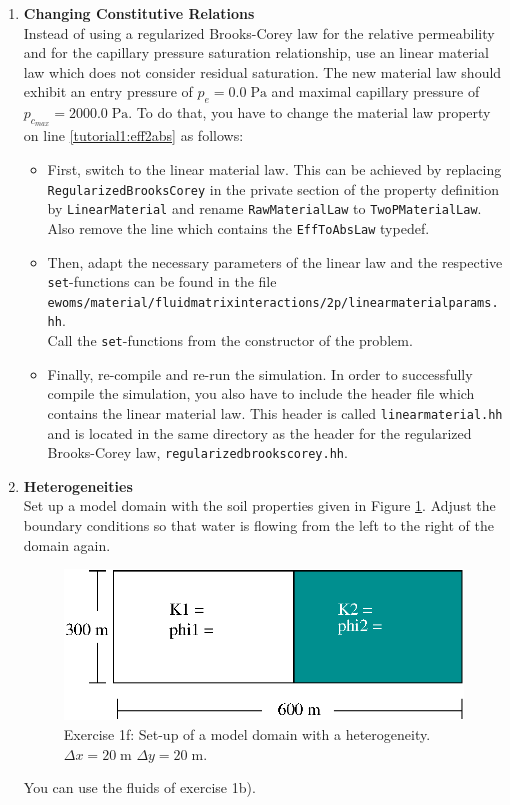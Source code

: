\begin{enumerate}
\item \textbf{Changing Constitutive Relations} \\
  Instead of using a regularized Brooks-Corey law for the relative
  permeability and for the capillary pressure saturation relationship,
  use an linear material law which does not consider residual
  saturation. The new material law should exhibit an entry pressure of
  $p_e = 0.0\;\text{Pa}$ and maximal capillary pressure of
  $p_{c_{max}} = 2000.0\;\text{Pa}$. To do that, you have to change
  the material law property on line
  \ref{tutorial1:eff2abs} as follows:
\begin{itemize}
\item First, switch to the linear material law. This can be achieved
  by replacing \texttt{RegularizedBrooksCorey} in the private section
  of the property definition by \texttt{LinearMaterial} and rename
  \texttt{RawMaterialLaw} to \texttt{TwoPMaterialLaw}. Also remove the
  line which contains the \texttt{EffToAbsLaw} typedef.
\item Then, adapt the necessary parameters of the linear law and the
  respective \texttt{set}-functions can be found in the file
  \texttt{ewoms/material/fluidmatrixinteractions/2p/linearmaterialparams.hh}.\\
  Call the \texttt{set}-functions from the constructor of the problem.
\item Finally, re-compile and re-run the simulation. In order to
  successfully compile the simulation, you also have to include the
  header file which contains the linear material law. This header is
  called \texttt{linearmaterial.hh} and is located in the same
  directory as the header for the regularized Brooks-Corey law,
  \texttt{regularizedbrookscorey.hh}.
\end{itemize}
 
\item \textbf{Heterogeneities}  \\
  Set up a model domain with the soil properties given in Figure
  \ref{tutorial1:exercise1_d}. Adjust the boundary conditions
  so that water is flowing from the left to the right of the domain again.
\begin{figure}[ht]
\centering
\includegraphics[width=0.5\linewidth,keepaspectratio]{EPS/exercise1_c.eps}
\caption{Exercise 1f: Set-up of a model domain with a heterogeneity. $\Delta x = 20 \;\text{m}$ $\Delta y = 20\;\text{m}$.}\label{tutorial1:exercise1_d}
\end{figure}
You can use the fluids of exercise 1b).


\end{enumerate}
